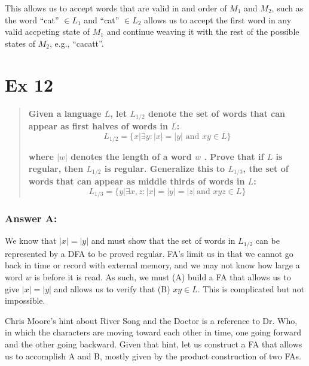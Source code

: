 \documentclass[titlepage]{article}\usepackage[]{graphicx}\usepackage[]{color}
\begin{document}
This allows us to accept words that are valid in and order of $M_1$  and $M_2$,
such as the word ``cat'' $\in L_1$ and ``cat'' $\in L_2$ allows us to accept
the first word in any valid accpeting state of $M_1$ and continue weaving it
with the rest of the possible states of $M_2$, e.g., ``cacatt''. 


\section*{Ex 12}
\begin{quote}
	\textbf{Given a language $L$, let $L_{1/2}$ denote the set of words that can appear
    as first halves of words in $L$:}
    \[ L_{1/2} = \{ x | \exists y : |x| = |y| \text{ and } x y \in L \} \]
    
  \textbf{where $|w |$ denotes the length of a word $w$ . Prove that if $L$ is
      regular, then $L_{1/2}$ is regular. Generalize this to $L_{1/3}$, the set of
      words that can appear as middle thirds of words in $L$:}
  \[ L_{1/3} = \{ y | \exists x,z : |x| = |y| = |z|\,  \text{and } x y z \in L \} \]
  
\end{quote}
\subsubsection*{Answer A:}
We know that $|x| = |y|$ and must show that the set of words in $L_{1/2}$ can
be represented by a DFA to be proved regular. FA's limit us in that we cannot
go back in time or record with external memory, and we may not know how large a
word $w$ is before it is read. As such, we must (A) build a FA that allows us to
give $|x| = |y|$ and allows us to verify that (B) $xy \in L$. This is complicated
but not impossible.

Chris Moore's hint about River Song and the Doctor is a reference to Dr. Who,
in which the characters are moving toward each other in time, one going
forward and the other going backward. Given that hint, let us construct a FA
that allows us to accomplish A and B, mostly given by the product construction
of two FAs.
\end{document}
